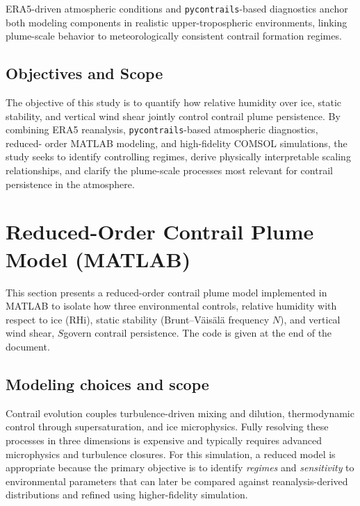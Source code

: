 \documentclass[11pt]{article}
\begin{document}
ERA5-driven atmospheric conditions and \texttt{pycontrails}-based diagnostics anchor both
modeling components in realistic upper-tropospheric environments, linking plume-scale
behavior to meteorologically consistent contrail formation regimes.

\subsection{Objectives and Scope}

The objective of this study is to quantify how relative humidity over ice, static
stability, and vertical wind shear jointly control contrail plume persistence. By
combining ERA5 reanalysis, \texttt{pycontrails}-based atmospheric diagnostics, reduced-
order MATLAB modeling, and high-fidelity COMSOL simulations, the study seeks to identify
controlling regimes, derive physically interpretable scaling relationships, and clarify
the plume-scale processes most relevant for contrail persistence in the atmosphere.


\section{Reduced-Order Contrail Plume Model (MATLAB)}
\label{sec:matlab_model}

This section presents a reduced-order contrail plume model implemented in MATLAB to
isolate how three environmental controls, relative humidity with respect to ice
(RHi), static stability (Brunt--V\"ais\"al\"a frequency $N$), and vertical wind shear, 
$S$govern contrail persistence. The code is given at the end of the document.
\subsection{Modeling choices and scope}
\label{sec:matlab_scope}

Contrail evolution couples turbulence-driven mixing and dilution, thermodynamic control
through supersaturation, and ice microphysics. Fully resolving these processes in
three dimensions is expensive and typically requires advanced microphysics and turbulence
closures. For this simulation, a reduced model is appropriate because the primary objective
is to identify \emph{regimes} and \emph{sensitivity} to environmental parameters that can
later be compared against reanalysis-derived distributions and refined using higher-fidelity
simulation.
\end{document}
